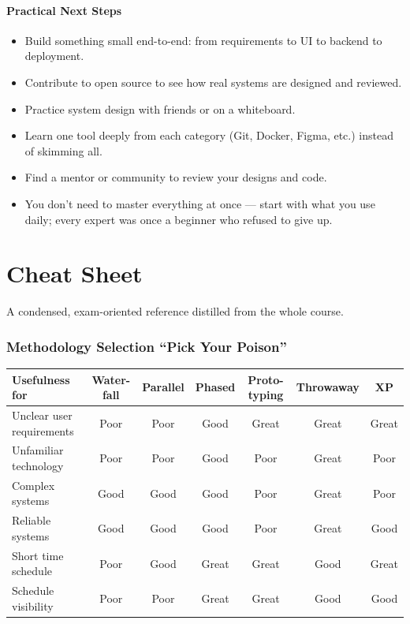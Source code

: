 \documentclass[hidelinks]{article}
\begin{document}
\subsection{Practical Next Steps}
\begin{itemize}
  \item Build something small end-to-end: from requirements to UI to backend to deployment.
  \item Contribute to open source to see how real systems are designed and reviewed.
  \item Practice system design with friends or on a whiteboard.
  \item Learn one tool deeply from each category (Git, Docker, Figma, etc.) instead of skimming all.
  \item Find a mentor or community to review your designs and code.
  \item You don't need to master everything at once --- start with what you use daily; every expert
        was once a beginner who refused to give up.
\end{itemize}

\part{Cheat Sheet}
A condensed, exam-oriented reference distilled from the whole course.

\section{Methodology Selection ``Pick Your Poison''}
\label{sec:cheat-methodology}
\renewcommand{\arraystretch}{1.3}
\noindent\begin{tabular}{|l|c|c|c|c|c|c|}
\hline
\textbf{\color{capri}Usefulness for} & \textbf{Water-fall} & \textbf{Parallel} & \textbf{Phased} & \textbf{Proto-typing} & \textbf{Throwaway} & \textbf{XP} \\
\hline
Unclear user requirements & Poor & Poor & Good  & Great & Great & Great \\ \hline
Unfamiliar technology     & Poor & Poor & Good  & Poor  & Great & Poor  \\ \hline
Complex systems           & Good & Good & Good  & Poor  & Great & Poor  \\ \hline
Reliable systems          & Good & Good & Good  & Poor  & Great & Good  \\ \hline
Short time schedule       & Poor & Good & Great & Great & Good  & Great \\ \hline
Schedule visibility       & Poor & Poor & Great & Great & Good  & Good  \\ \hline
\end{tabular}
\end{document}
